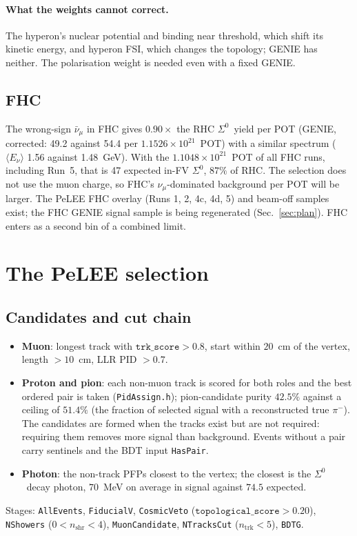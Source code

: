 \documentclass[11pt,a4paper]{article}
\newcommand{\Szero}{\ensuremath{\Sigma^{0}}}
\newcommand{\numubar}{\ensuremath{\bar{\nu}_\mu}}
\begin{document}
\paragraph{What the weights cannot correct.} The hyperon's nuclear potential and binding
near threshold, which shift its kinetic energy, and hyperon FSI, which changes the
topology; GENIE has neither. The polarisation weight is needed even with a fixed GENIE.

\subsection{FHC}
\label{sec:fhc}
The wrong-sign $\numubar$ in FHC gives $0.90\times$ the RHC \Szero\ yield per POT
(GENIE, corrected: 49.2 against 54.4 per $1.1526\times10^{21}$~POT) with a similar
spectrum ($\langle E_\nu\rangle$ 1.56 against 1.48~GeV). With the $1.1048\times10^{21}$~POT
of all FHC runs, including Run~5, that is 47 expected in-FV \Szero, $87\%$ of RHC. The
selection does not use the muon charge, so FHC's $\nu_\mu$-dominated background per POT
will be larger. The PeLEE FHC overlay (Runs 1, 2, 4c, 4d, 5) and beam-off samples exist;
the FHC GENIE signal sample is being regenerated (Sec.~\ref{sec:plan}). FHC enters as a
second bin of a combined limit.

\section{The PeLEE selection}
\label{sec:pelee}

\subsection{Candidates and cut chain}
\begin{itemize}
  \item \textbf{Muon}: longest track with $\texttt{trk\_score}>0.8$, start within
        $20$~cm of the vertex, length $>10$~cm, LLR PID $>0.7$.
  \item \textbf{Proton and pion}: each non-muon track is scored for both roles and the
        best ordered pair is taken (\texttt{PidAssign.h}); pion-candidate purity
        $42.5\%$ against a ceiling of $51.4\%$ (the fraction of selected signal with a
        reconstructed true $\pi^-$). The candidates are formed when the tracks exist but
        are not required: requiring them removes more signal than background. Events
        without a pair carry sentinels and the BDT input \texttt{HasPair}.
  \item \textbf{Photon}: the non-track PFPs closest to the vertex; the closest is the
        \Szero\ decay photon, $70$~MeV on average in signal against $74.5$ expected.
\end{itemize}
Stages: \texttt{AllEvents}, \texttt{FiducialV}, \texttt{CosmicVeto}
($\texttt{topological\_score}>0.20$), \texttt{NShowers} ($0<n_{\mathrm{shr}}<4$),
\texttt{MuonCandidate}, \texttt{NTracksCut} ($n_{\mathrm{trk}}<5$), \texttt{BDTG}.
\end{document}
